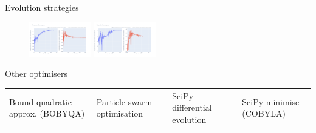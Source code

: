 \documentclass[aspectratio=169]{beamer} %
\begin{document}
\begin{frame}{Evolution strategies}
\begin{figure}
        \includegraphics[width=0.24\textwidth]{Images/Optimisers/xnes_params.png}
        \includegraphics[width=0.24\textwidth]{Images/Optimisers/cmaes_params.png}
        \label{fig:optimisers4}
    \end{figure}
\end{frame}

\begin{frame}{Other optimisers}
    \vspace{-6mm}
    \begin{table}[]
        \centering
        \footnotesize
    \begin{tabularx}{\textwidth}{*{4}{Y}}
         Bound quadratic approx. (BOBYQA) &
         Particle swarm optimisation &
         SciPy differential evolution &
         SciPy minimise (COBYLA)
    \end{tabularx}
    \end{table}


\end{frame}
\end{document}
